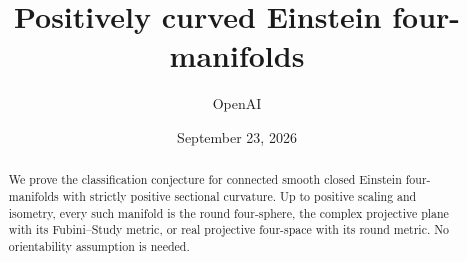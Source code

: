\documentclass[11pt]{article}
\title{Positively curved Einstein four-manifolds}
\author{OpenAI}
\date{September 23, 2026}
\theoremstyle{definition}
\theoremstyle{remark}
\begin{document}
\maketitle
\begin{abstract}
We prove the classification conjecture for connected smooth closed Einstein four-manifolds with strictly positive sectional curvature. Up to positive scaling and isometry, every such manifold is the round four-sphere, the complex projective plane with its Fubini--Study metric, or real projective four-space with its round metric. No orientability assumption is needed.
\end{abstract}

\clearpage
\begingroup
\small
\tableofcontents
\endgroup
\clearpage







\appendix


\clearpage

\end{document}
